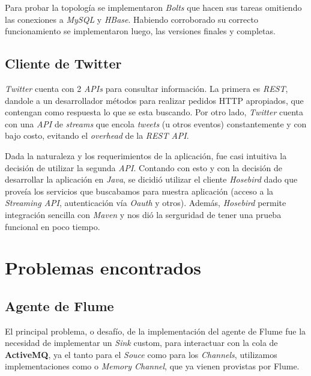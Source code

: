 \documentclass[a4paper,10pt]{article}
\begin{document}
Para probar la topología se implementaron \textit{Bolts} que hacen sus tareas omitiendo las conexiones a \textit{MySQL} y \textit{HBase}.
Habiendo corroborado su correcto funcionamiento se implementaron luego, las versiones finales y completas.

\subsection{Cliente de Twitter}

\textit{Twitter} cuenta con 2 \textit{APIs} para consultar información. La primera es \textit{REST}, dandole a un desarrollador métodos para realizar pedidos HTTP apropiados,
que contengan como respuesta lo que se esta buscando. Por otro lado, \textit{Twitter} cuenta con una \textit{API} de \textit{streams} que encola \textit{tweets} (u otros eventos)
constantemente y con bajo costo, evitando el \textit{overhead} de la \textit{REST API}.

Dada la naturaleza y los requerimientos de la aplicación, fue casi intuitiva la decisión de utilizar la segunda \textit{API}. Contando con esto y con la decisión de desarrollar
la aplicación en \textit{Java}, se dicidió utilizar el cliente \textit{Hosebird} dado que proveía los servicios que buscabamos para nuestra aplicación (acceso a la
\textit{Streaming API}, autenticación vía \textit{Oauth} y otros). Además, \textit{Hosebird} permite integración sencilla con \textit{Maven} y nos dió la serguridad de tener
una prueba funcional en poco tiempo.

\section{Problemas encontrados}

\subsection{Agente de Flume}
El principal problema, o desafío, de la implementación del agente de Flume fue la necesidad de implementar un \textit{Sink} custom, para interactuar con la cola
de \textbf{ActiveMQ}, ya el tanto para el \textit{Souce} como para los \textit{Channels}, utilizamos implementaciones como  o \textit{Memory Channel},
que ya vienen provistas por Flume.
\end{document}
